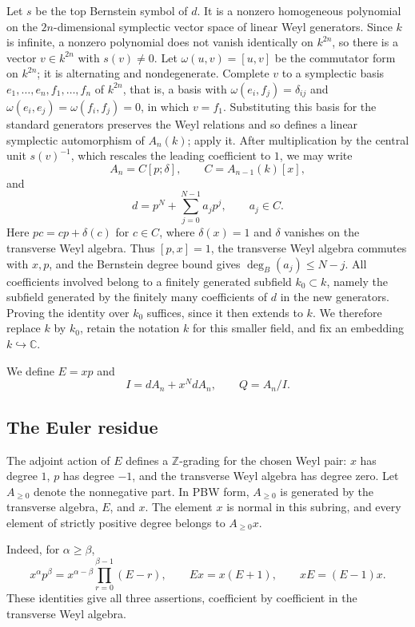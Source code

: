 \documentclass[11pt]{amsart}
\theoremstyle{definition}
\begin{document}
Let $s$ be the top Bernstein symbol of $d$. It is a nonzero homogeneous
polynomial on the $2n$-dimensional symplectic vector space of linear Weyl
generators. %
Since $k$ is infinite, a nonzero polynomial does not vanish identically on
$k^{2n}$, so there is a vector $v\in k^{2n}$ with $s(v)\neq0$. Let
$\omega(u,v)=[u,v]$ be the commutator form on $k^{2n}$; it is alternating and
nondegenerate. Complete $v$ to a symplectic basis
$e_1,\dots,e_n,f_1,\dots,f_n$ of $k^{2n}$, that is, a basis with
$\omega(e_i,f_j)=\delta_{ij}$ and $\omega(e_i,e_j)=\omega(f_i,f_j)=0$, in
which $v=f_1$. Substituting this basis for the standard generators preserves
the Weyl relations and so defines a linear symplectic automorphism of
$A_n(k)$; apply it. After multiplication by the central unit $s(v)^{-1}$,
which rescales the leading coefficient to $1$, we may write
\[
 A_n=C[p;\delta],\qquad C=A_{n-1}(k)[x],
 \tag{2.1}\label{eq:ore-chart}
\]
and
\[
 d=p^N+\sum_{j=0}^{N-1}a_jp^j,\qquad a_j\in C.
 \tag{2.2}\label{eq:monic-d}
\]
Here $pc=cp+\delta(c)$ for $c\in C$, where $\delta(x)=1$ and $\delta$ vanishes
on the transverse Weyl algebra. Thus $[p,x]=1$, the transverse Weyl algebra
commutes with $x,p$, and the
Bernstein degree bound gives $\deg_B(a_j)\leq N-j$. All coefficients involved
belong to a finitely generated subfield $k_0\subset k$, namely the subfield
generated by the finitely many coefficients of $d$ in the new generators.
Proving the identity
over $k_0$ suffices, since it then extends to $k$. We therefore replace $k$
by $k_0$, retain the notation $k$ for this smaller field, and fix an embedding
$k\hookrightarrow\mathbb C$.

We define $E=xp$ and
\[
 I=dA_n+x^NdA_n,\qquad Q=A_n/I.
 \tag{2.3}\label{eq:I-Q}
\]

\subsection{The Euler residue}

The adjoint action of $E$ defines a $\mathbb Z$-grading for the chosen Weyl
pair: $x$ has degree $1$, $p$ has degree $-1$, and the transverse Weyl algebra
has degree zero. Let $A_{\geq0}$ denote the nonnegative part. In PBW form,
$A_{\geq0}$ is generated by the transverse algebra, $E$, and $x$. The element
$x$ is normal in this subring, and every element of strictly positive degree
belongs to $A_{\geq0}x$.

Indeed, for $\alpha\geq\beta$,
\[
 x^\alpha p^\beta
 =x^{\alpha-\beta}\prod_{r=0}^{\beta-1}(E-r),
 \qquad Ex=x(E+1),\qquad xE=(E-1)x.
 \tag{2.4}\label{eq:nonnegative-pbw}
\]
These identities give all three assertions, coefficient by coefficient in the
transverse Weyl algebra.
\end{document}
